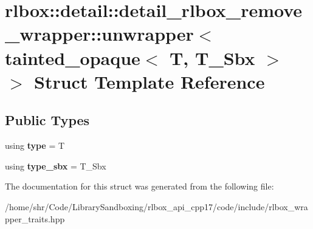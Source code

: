 \hypertarget{structrlbox_1_1detail_1_1detail__rlbox__remove__wrapper_1_1unwrapper_3_01tainted__opaque_3_01T_00_01T__Sbx_01_4_01_4}{}\section{rlbox\+:\+:detail\+:\+:detail\+\_\+rlbox\+\_\+remove\+\_\+wrapper\+:\+:unwrapper$<$ tainted\+\_\+opaque$<$ T, T\+\_\+\+Sbx $>$ $>$ Struct Template Reference}
\label{structrlbox_1_1detail_1_1detail__rlbox__remove__wrapper_1_1unwrapper_3_01tainted__opaque_3_01T_00_01T__Sbx_01_4_01_4}
\subsection*{Public Types}
\begin{DoxyCompactItemize}
\item 
\mbox{\label{structrlbox_1_1detail_1_1detail__rlbox__remove__wrapper_1_1unwrapper_3_01tainted__opaque_3_01T_00_01T__Sbx_01_4_01_4_ad138d193f218b44c9b5ea938447673c8}} 
using {\bfseries type} = T
\item 
\mbox{\label{structrlbox_1_1detail_1_1detail__rlbox__remove__wrapper_1_1unwrapper_3_01tainted__opaque_3_01T_00_01T__Sbx_01_4_01_4_a74334bbae27eacae858c7bf841e8cb25}} 
using {\bfseries type\+\_\+sbx} = T\+\_\+\+Sbx
\end{DoxyCompactItemize}


The documentation for this struct was generated from the following file\+:\begin{DoxyCompactItemize}
\item 
/home/shr/\+Code/\+Library\+Sandboxing/rlbox\+\_\+api\+\_\+cpp17/code/include/rlbox\+\_\+wrapper\+\_\+traits.\+hpp\end{DoxyCompactItemize}
